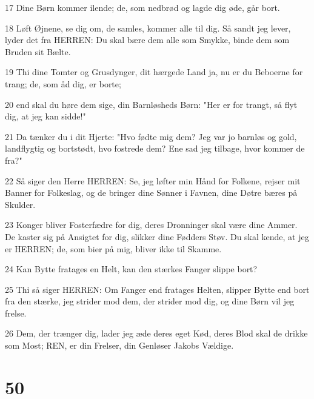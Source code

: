 \par 17 Dine Børn kommer ilende; de, som nedbrød og lagde dig øde, går bort.
\par 18 Løft Øjnene, se dig om, de samles, kommer alle til dig. Så sandt jeg lever, lyder det fra HERREN: Du skal bære dem alle som Smykke, binde dem som Bruden sit Bælte.
\par 19 Thi dine Tomter og Grusdynger, dit hærgede Land ja, nu er du Beboerne for trang; de, som åd dig, er borte;
\par 20 end skal du høre dem sige, din Barnløsheds Børn: "Her er for trangt, så flyt dig, at jeg kan sidde!"
\par 21 Da tænker du i dit Hjerte: "Hvo fødte mig dem? Jeg var jo barnløs og gold, landflygtig og bortstødt, hvo fostrede dem? Ene sad jeg tilbage, hvor kommer de fra?"
\par 22 Så siger den Herre HERREN: Se, jeg løfter min Hånd for Folkene, rejser mit Banner for Folkeslag, og de bringer dine Sønner i Favnen, dine Døtre bæres på Skulder.
\par 23 Konger bliver Fosterfædre for dig, deres Dronninger skal være dine Ammer. De kaster sig på Ansigtet for dig, slikker dine Fødders Støv. Du skal kende, at jeg er HERREN; de, som bier på mig, bliver ikke til Skamme.
\par 24 Kan Bytte fratages en Helt, kan den stærkes Fanger slippe bort?
\par 25 Thi så siger HERREN: Om Fanger end fratages Helten, slipper Bytte end bort fra den stærke, jeg strider mod dem, der strider mod dig, og dine Børn vil jeg frelse.
\par 26 Dem, der trænger dig, lader jeg æde deres eget Kød, deres Blod skal de drikke som Most; REN, er din Frelser, din Genløser Jakobs Vældige.

\chapter{50}

